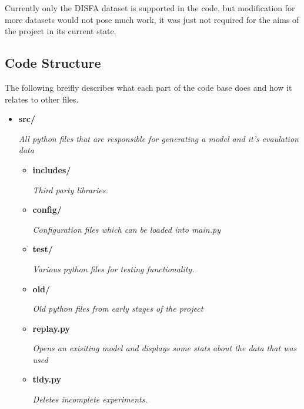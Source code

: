     Currently only the DISFA dataset is supported in the code, but modification for more datasets would not pose much work, it was just
    not required for the aims of the project in its current state.



    \subsection{Code Structure} \label{sec:codestruct}
      The following breifly describes what each part of the code base does and how it relates
      to other files.
      {\small
      \begin{itemize}
        \item   {\bf src/}
                \begin{sloppypar} \textit{All python files that are responsible for generating a model and it's evaulation data}\end{sloppypar}
                \begin{itemize}
                  \item {\bf includes/ }
                  \begin{sloppypar} \textit{Third party libraries.}\end{sloppypar}
                  \item {\bf config/ }
                  \begin{sloppypar} \textit{Configuration files which can be loaded into main.py}\end{sloppypar}
                  \item {\bf test/ }
                  \begin{sloppypar} \textit{Various python files for testing functionality.}\end{sloppypar}
                  \item {\bf old/ }
                  \begin{sloppypar} \textit{Old python files from early stages of the project}\end{sloppypar}
                  \item {\bf replay.py }
                  \begin{sloppypar} \textit{Opens an exisiting model and displays some stats about the data that was used}\end{sloppypar}
                  \item {\bf tidy.py }
                  \begin{sloppypar} \textit{Deletes incomplete experiments.}\end{sloppypar}

\end{itemize}
\end{itemize}}
